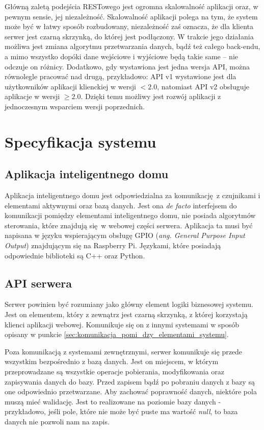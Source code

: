 \documentclass[eng,oneside]{mgr}
\begin{document}
Główną zaletą podejścia RESTowego jest ogromna skalowalność aplikacji oraz, w pewnym sensie, jej niezależność. Skalowalność aplikacji polega na tym, że system może być w łatwy sposób rozbudowany, niezależność zaś oznacza, że dla klienta serwer jest czarną skrzynką, do której jest podłączony. W trakcie jego działania możliwa jest zmiana algorytmu przetwarzania danych, bądź też całego back-endu, a mimo wszystko dopóki dane wejściowe i wyjściowe będą takie same – nie odczuje on różnicy. Dodatkowo, gdy wystawiona jest jedna wersja API, można równolegle pracować nad drugą, przykładowo: API v1 wystawione jest dla użytkowników aplikacji klienckiej w wersji $<2.0$, natomiast API v2 obsługuje aplikacje w wersji $\ge2.0$. Dzięki temu możliwy jest rozwój aplikacji z jednoczesnym wsparciem wersji poprzednich. 

\chapter{Specyfikacja systemu}
\section{Aplikacja inteligentnego domu} %
\label{sec:specyfikacja_aplikacja_inteligentnego_domu}
Aplikacja inteligentnego domu jest odpowiedzialna za komunikację z czujnikami i elementami aktywnymi oraz bazą danych. Jest ona \emph{de facto} interfejsem do komunikacji pomiędzy elementami inteligentnego domu, nie posiada algorytmów sterowania, które znajdują się w webowej części serwera.
Aplikacja ta musi być napisana w języku wspierającym obsługę GPIO (\emph{ang. General Purpose Input Output}) znajdującym się na Raspberry Pi. Językami, które posiadają odpowiednie biblioteki są C++ oraz Python.

\section{API serwera}
Serwer powinien być rozumiany jako główny element logiki biznesowej systemu. Jest on elementem, który z zewnątrz jest czarną skrzynką, z której korzystają klienci aplikacji webowej. Komunikuje się on z innymi systemami w sposób opisany w punkcie \ref{sec:komunikacja_pomi_dzy_elementami_systemu}.

Poza komunikacją z systemami zewnętrznymi, serwer komunikuje się przede wszystkim bezpośrednio z bazą danych. Jest on miejscem, w którym przeprowadzane są wszystkie operacje pobierania, modyfikowania oraz zapisywania danych do bazy. Przed zapisem bądź po pobraniu danych z bazy są one odpowiednio przetwarzane. Aby zachować poprawność danych, niektóre pola muszą mieć walidację. Jest to realizowane na poziomie bazy danych - przykładowo, jeśli pole, które nie może być puste ma wartość \emph{null}, to baza danych nie pozwoli nam na zapis.
\end{document}
